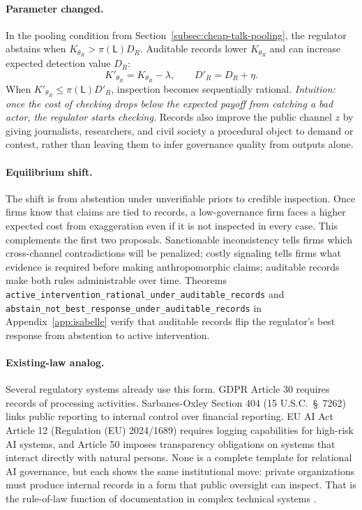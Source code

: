 \paragraph{Parameter changed.}
In the pooling condition from Section~\ref{subsec:cheap-talk-pooling}, the
regulator abstains when $K_{\theta_R}>\pi(\mathsf{L})D_R$. Auditable records
lower $K_{\theta_R}$ and can increase expected detection value $D_R$:
\[
K'_{\theta_R}=K_{\theta_R}-\lambda,\qquad
D'_R=D_R+\eta .
\]
When $K'_{\theta_R}\leq \pi(\mathsf{L})D'_R$, inspection becomes sequentially
rational.
\emph{Intuition: once the cost of checking drops below the expected payoff from catching a bad actor, the regulator starts checking.}
Records also improve the public channel $z$ by giving journalists,
researchers, and civil society a procedural object to demand or contest, rather
than leaving them to infer governance quality from outputs alone.

\paragraph{Equilibrium shift.}
The shift is from abstention under unverifiable priors to credible inspection.
Once firms know that claims are tied to records, a low-governance firm faces a
higher expected cost from exaggeration even if it is not inspected in every
case. This complements the first two proposals. Sanctionable inconsistency tells
firms which cross-channel contradictions will be penalized; costly signaling
tells firms what evidence is required before making anthropomorphic claims;
auditable records make both rules administrable over time. Theorems \texttt{active\_\allowbreak{}intervention\_\allowbreak{}rational\_\allowbreak{}under\_\allowbreak{}auditable\_\allowbreak{}records} and \texttt{abstain\_\allowbreak{}not\_\allowbreak{}best\_\allowbreak{}response\_\allowbreak{}under\_\allowbreak{}auditable\_\allowbreak{}records} in Appendix~\ref{app:isabelle} verify that auditable records flip the regulator's best response from abstention to active intervention.

\paragraph{Existing-law analog.}
Several regulatory systems already use this form. GDPR Article 30 requires
records of processing activities. Sarbanes-Oxley Section 404 (15 U.S.C.\ \S~7262) links public
reporting to internal control over financial reporting. EU AI Act Article 12
(Regulation (EU) 2024/1689) requires logging capabilities for high-risk AI systems,
and Article 50 imposes transparency obligations on systems that interact directly with
natural persons. None is a complete
template for relational AI governance, but each shows the same institutional
move: private organizations must produce internal records in a form that public
oversight can inspect. That is the rule-of-law function of documentation in
complex technical systems \citep{hadfield2017rules}.

